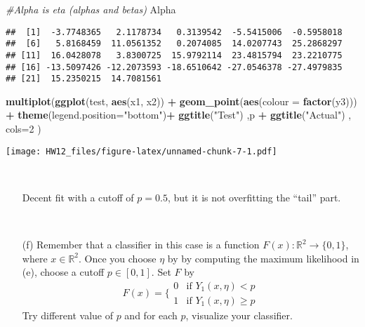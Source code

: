 \documentclass[]{article}
\newenvironment{Shaded}{\begin{snugshade}}{\end{snugshade}}
\newcommand{\KeywordTok}[1]{\textcolor[rgb]{0.13,0.29,0.53}{\textbf{#1}}}
\newcommand{\DataTypeTok}[1]{\textcolor[rgb]{0.13,0.29,0.53}{#1}}
\newcommand{\DecValTok}[1]{\textcolor[rgb]{0.00,0.00,0.81}{#1}}
\newcommand{\StringTok}[1]{\textcolor[rgb]{0.31,0.60,0.02}{#1}}
\newcommand{\CommentTok}[1]{\textcolor[rgb]{0.56,0.35,0.01}{\textit{#1}}}
\newcommand{\OperatorTok}[1]{\textcolor[rgb]{0.81,0.36,0.00}{\textbf{#1}}}
\newcommand{\NormalTok}[1]{#1}
\begin{document}
\begin{Shaded}
\begin{Highlighting}[]
\CommentTok{#Alpha is eta (alphas and betas)}
\NormalTok{Alpha}
\end{Highlighting}
\end{Shaded}

\begin{verbatim}
##  [1]  -3.7748365   2.1178734   0.3139542  -5.5415006  -0.5958018
##  [6]   5.8168459  11.0561352   0.2074085  14.0207743  25.2868297
## [11]  16.0428078   3.8300725  15.9792114  23.4815794  23.2210775
## [16] -13.5097426 -12.2073593 -18.6510642 -27.0546378 -27.4979835
## [21]  15.2350215  14.7081561
\end{verbatim}

\begin{Shaded}
\begin{Highlighting}[]
\KeywordTok{multiplot}\NormalTok{(}\KeywordTok{ggplot}\NormalTok{(test, }\KeywordTok{aes}\NormalTok{(x1, x2)) }\OperatorTok{+}\StringTok{ }\KeywordTok{geom_point}\NormalTok{(}\KeywordTok{aes}\NormalTok{(}\DataTypeTok{colour =} \KeywordTok{factor}\NormalTok{(y3))) }\OperatorTok{+}
\StringTok{            }\KeywordTok{theme}\NormalTok{(}\DataTypeTok{legend.position=}\StringTok{"bottom"}\NormalTok{)}\OperatorTok{+}\StringTok{ }\KeywordTok{ggtitle}\NormalTok{(}\StringTok{"Test"}\NormalTok{)   ,p }\OperatorTok{+}\StringTok{ }\KeywordTok{ggtitle}\NormalTok{(}\StringTok{"Actual"}\NormalTok{) ,  }\DataTypeTok{cols=}\DecValTok{2}\NormalTok{ ) }
\end{Highlighting}
\end{Shaded}

\texttt{[image: HW12\_files/figure-latex/unnamed-chunk-7-1.pdf]}

~

\begin{itemize}\item[]  \hfil Decent fit with a cutoff of $p=0.5$, but it is not overfitting the ``tail'' part.
\end{itemize}

~

\begin{itemize} \item[(f)] Remember that a classifier in this case is a function $F(x) : \mathbb{R}^2 \to \{0, 1\}$, where $x \in \mathbb{R}^2$.   Once you choose $\eta$ by by computing the maximum likelihood in (e), choose a cutoff $p \in [0,1]$.  Set $F$ by
\begin{equation}
F(x) = \big\{
\begin{array}{cc}
0 & \text{if } Y_1(x, \eta) < p \\ 
1 & \text{if } Y_1(x, \eta) \ge p
\end{array}
\end{equation} 
Try different value of $p$ and for each $p$, visualize your classifier.  
 \ 
 
\end{itemize}
\end{document}
